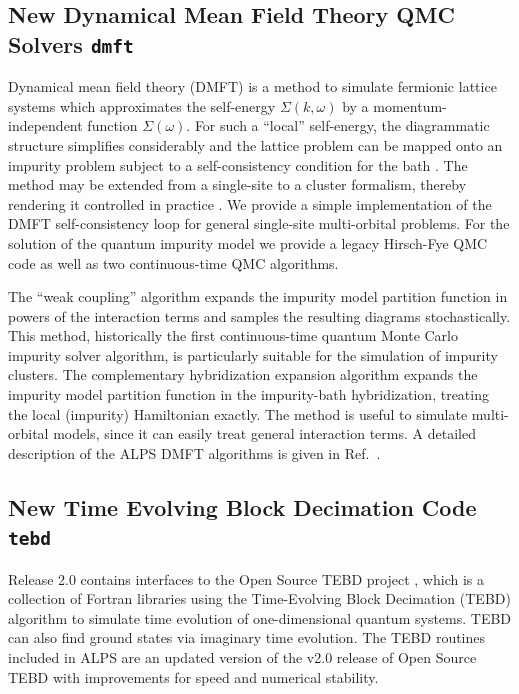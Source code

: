 \documentclass[12pt]{iopart}
\begin{document}
\subsection{New Dynamical Mean Field Theory QMC Solvers {\tt dmft}}
Dynamical mean field theory (DMFT) is a method to simulate fermionic lattice systems which approximates the self-energy $\Sigma(k,\omega)$ by a momentum-independent 
function $\Sigma(\omega)$. For such a ``local'' self-energy, the diagrammatic structure simplifies considerably and the lattice problem can be mapped onto an impurity problem subject to a self-consistency condition for the bath \cite{Georges96,Kotliar06}. The method may be extended from a single-site to a cluster formalism, thereby rendering it controlled in practice \cite{Maier05}.
We provide a simple implementation of the DMFT self-consistency loop for general single-site multi-orbital problems.
For the solution of the quantum impurity model we provide a legacy Hirsch-Fye QMC code \cite{Hirsch86} as well as two continuous-time QMC algorithms.

The ``weak coupling'' algorithm \cite{Rubtsov04,Rubtsov05} expands the impurity model partition function in powers of the interaction terms and samples the resulting diagrams stochastically. This method, historically
the first continuous-time quantum Monte Carlo impurity solver algorithm, is particularly suitable for the simulation of impurity clusters.
The complementary hybridization expansion algorithm \cite{Werner06,Werner06Kondo} expands the impurity model partition function in the impurity-bath hybridization, treating 
the local (impurity) Hamiltonian exactly. 
The method is useful to simulate multi-orbital models, since it can easily treat general interaction terms. A detailed description of the ALPS DMFT algorithms is given in Ref.~\cite{ALPSDMFT}.


\subsection{New Time Evolving Block Decimation Code {\tt tebd}}
Release 2.0 contains interfaces to the Open Source TEBD project \cite{ostebd}, which is a collection of Fortran libraries using the Time-Evolving Block Decimation (TEBD) algorithm \cite{vidal1, vidal2} to simulate time evolution of one-dimensional quantum systems.  TEBD can also find ground states via imaginary time evolution.  The TEBD routines included in ALPS are an updated version of the v2.0 release of Open Source TEBD with improvements for speed and numerical stability.
\end{document}
